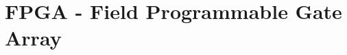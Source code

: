 \documentclass[a3paper, landscape, twocolumn]{article}
\begin{document}
\section*{FPGA - Field Programmable Gate Array}
\lipsum
\end{document}
